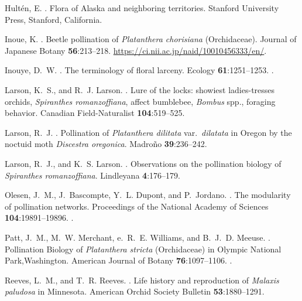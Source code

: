 \begin{multicols}{2}
\begin{thebibliography}{27}
Hultén, E.
.
\newblock Flora of {Alaska} and neighboring territories.
\newblock Stanford University Press, Stanford, California.

Inoue, K.
.
\newblock Beetle pollination of \emph{Platanthera chorisiana} (Orchidaceae).
\newblock Journal of Japanese Botany {\bfseries 56}:213--218.
\newblock \urlprefix\url{https://ci.nii.ac.jp/naid/10010456333/en/}.

Inouye, D.~W.
.
\newblock The terminology of floral larceny.
\newblock Ecology {\bfseries 61}:1251--1253.
\newblock {}.

Larson, K.~S., and R.~J. Larson.
.
\newblock Lure of the locks: showiest ladies-tresses orchids, \emph{Spiranthes
  romanzoffiana}, affect bumblebee, \emph{Bombus} spp., foraging behavior.
\newblock Canadian Field-Naturalist {\bfseries 104}:519--525.

Larson, R.~J.
.
\newblock Pollination of \emph{Platanthera dilitata} var.\ \emph{dilatata} in
  {Oregon} by the noctuid moth \emph{Discestra oregonica}.
\newblock Madro\~{n}o {\bfseries 39}:236--242.

Larson, R.~J., and K.~S. Larson.
.
\newblock Observations on the pollination biology of \emph{Spiranthes
  romanzoffiana}.
\newblock Lindleyana {\bfseries 4}:176--179.

Olesen, J.~M., J.~Bascompte, Y.~L. Dupont, and P.~Jordano.
.
\newblock The modularity of pollination networks.
\newblock Proceedings of the National Academy of Sciences {\bfseries
  104}:19891--19896.
\newblock {}.

Patt, J.~M., M.~W. Merchant, e.~R.~E. Williams, and B.~J.~D. Meeuse.
.
\newblock Pollination Biology of \emph{Platanthera stricta} (Orchidaceae) in
  Olympic National Park,Washington.
\newblock American Journal of Botany {\bfseries 76}:1097--1106.
\newblock {}.

Reeves, L.~M., and T.~R. Reeves.
.
\newblock Life history and reproduction of \emph{Malaxis paludosa} in
  Minnesota.
\newblock American Orchid Society Bulletin {\bfseries 53}:1880--1291.


\end{thebibliography}
\end{multicols}
